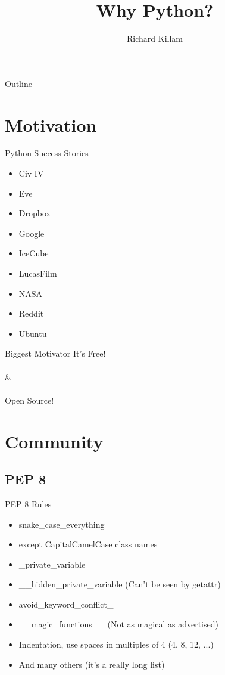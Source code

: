 \documentclass[11pt]{beamer}
\author{Richard Killam}
\title{Why Python?}
\newcommand{\emptyline}{$ $\\}
\begin{document}
	\centering

	\begin{frame}
		\titlepage
	\end{frame}

	\begin{frame}{Outline}
		\begin{multicols}{2}
			\tableofcontents
		\end{multicols}
	\end{frame}

	\section{Motivation}
		\begin{frame}{Python Success Stories}
			\begin{itemize}
				\item Civ IV   
				\item Eve
    				\item Dropbox
    				\item Google
    				\item IceCube
    				\item LucasFilm
    				\item NASA
    				\item Reddit
    				\item Ubuntu
			\end{itemize}
		\end{frame}
		
		\begin{frame}{Biggest Motivator}
			\pause
    			\fontsize{30pt}{20pt}\selectfont
    			It's Free! \\
    			\emptyline
    			\& \\
    			\emptyline
    			Open Source!
		\end{frame}
	
	\section{Community}
	\subsection{PEP 8}
		\begin{frame}[fragile]{PEP 8 Rules}
			\begin{itemize}
				\item snake\_case\_everything
				\item except CapitalCamelCase class names
				\item \_private\_variable
				\item \_\_hidden\_private\_variable (Can't be seen by getattr)
				\item avoid\_keyword\_conflict\_
				\item \_\_magic\_functions\_\_ (Not as magical as advertised)
				\item Indentation, use spaces in multiples of 4 (4, 8, 12, ...)
				\item And many others (it's a really long list)
			\end{itemize}
		\end{frame}
		
\end{document}
